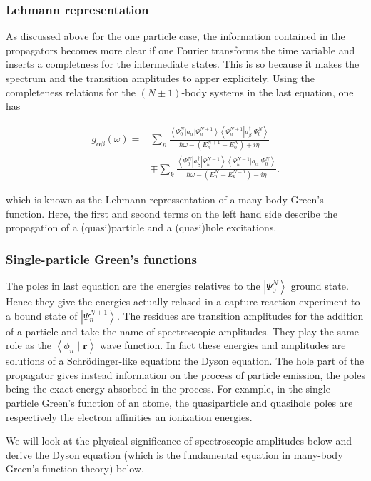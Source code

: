 \documentclass[compress]{beamer}
\begin{document}
\frame
{
\frametitle{Lehmann representation}
\begin{small}
{\scriptsize

As discussed above for the one particle case, the information
contained in the propagators becomes more clear if one Fourier
transforms the time variable and inserts a completness for the
intermediate states. This is so because it makes the spectrum and the
transition amplitudes to apper explicitely. Using the completeness
relations for the $(N \pm 1)$-body systems in the last equation, one has

$$
\begin{aligned}
g_{\alpha \beta}(\omega)= & \sum_{n} \frac{\left\langle\Psi_{0}^{N}\left|a_{\alpha}\right| \Psi_{n}^{N+1}\right\rangle\left\langle\Psi_{n}^{N+1}\left|a_{\beta}^{\dagger}\right| \Psi_{0}^{N}\right\rangle}{\hbar \omega-\left(E_{n}^{N+1}-E_{0}^{N}\right)+i \eta} \\
& \mp \sum_{k} \frac{\left\langle\Psi_{0}^{N}\left|a_{\beta}^{\dagger}\right| \Psi_{k}^{N-1}\right\rangle\left\langle\Psi_{k}^{N-1}\left|a_{\alpha}\right| \Psi_{0}^{N}\right\rangle}{\hbar \omega-\left(E_{0}^{N}-E_{k}^{N-1}\right)-i \eta} .
\end{aligned}
$$

which is known as the Lehmann repressentation of a many-body Green's
function. Here, the first and second terms on the left hand
side describe the propagation of a (quasi)particle and a (quasi)hole
excitations.

}
\end{small}
}
\frame
{
\frametitle{Single-particle Green's functions}
\begin{small}
{\scriptsize
The poles in last equation are the energies relatives to the
$\left|\Psi_{0}^{N}\right\rangle$ ground state. Hence they give the
energies actually relased in a capture reaction experiment to a bound
state of $\left|\Psi_{n}^{N+1}\right\rangle$. The residues are
transition amplitudes for the addition of a particle and take the name
of spectroscopic amplitudes. They play the same role as the
$\left\langle\phi_{n} \mid \mathbf{r}\right\rangle$ wave function.
In fact these energies and amplitudes are solutions of a
Schr\"odinger-like equation: the Dyson equation. The hole part of the
propagator gives instead information on the process of particle
emission, the poles being the exact energy absorbed in the
process. For example, in the single particle Green's function of an atome,
the quasiparticle and quasihole poles are respectively the
electron affinities an ionization energies.

We will look at the physical significance of spectroscopic amplitudes
below and derive the Dyson equation (which is the
fundamental equation in many-body Green's function theory) below.

}
\end{small}
}
\end{document}
